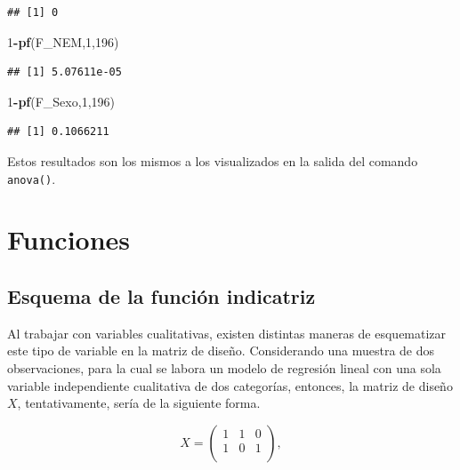 \documentclass[
  11pt,
]{book}
\newenvironment{Shaded}{\begin{snugshade}}{\end{snugshade}}
\newcommand{\DecValTok}[1]{\textcolor[rgb]{0.00,0.00,0.81}{#1}}
\newcommand{\FunctionTok}[1]{\textcolor[rgb]{0.13,0.29,0.53}{\textbf{#1}}}
\newcommand{\NormalTok}[1]{#1}
\newcommand{\SpecialCharTok}[1]{\textcolor[rgb]{0.81,0.36,0.00}{\textbf{#1}}}
\theoremstyle{definition}
\theoremstyle{definition}
\theoremstyle{definition}
\theoremstyle{definition}
\theoremstyle{remark}
\begin{document}
\begin{verbatim}
## [1] 0
\end{verbatim}

\begin{Shaded}
\begin{Highlighting}[]
\DecValTok{1}\SpecialCharTok{{-}}\FunctionTok{pf}\NormalTok{(F\_NEM,}\DecValTok{1}\NormalTok{,}\DecValTok{196}\NormalTok{)}
\end{Highlighting}
\end{Shaded}

\begin{verbatim}
## [1] 5.07611e-05
\end{verbatim}

\begin{Shaded}
\begin{Highlighting}[]
\DecValTok{1}\SpecialCharTok{{-}}\FunctionTok{pf}\NormalTok{(F\_Sexo,}\DecValTok{1}\NormalTok{,}\DecValTok{196}\NormalTok{)}
\end{Highlighting}
\end{Shaded}

\begin{verbatim}
## [1] 0.1066211
\end{verbatim}

Estos resultados son los mismos a los visualizados en la salida del comando \texttt{anova()}.

\chapter{Funciones}\label{funciones}

\section{Esquema de la función indicatriz}\label{funcion-indicatriz}

Al trabajar con variables cualitativas, existen distintas maneras de esquematizar este tipo de variable en la matriz de diseño. Considerando una muestra de dos observaciones, para la cual se labora un modelo de regresión lineal con una sola variable independiente cualitativa de dos categorías, entonces, la matriz de diseño \(X\), tentativamente, sería de la siguiente forma.

\begin{equation}
X = \begin{pmatrix}
1 & 1 & 0 \\
1 & 0 & 1 \\
\end{pmatrix},
\label{eq:matriz-colineal}
\end{equation}
\end{document}
